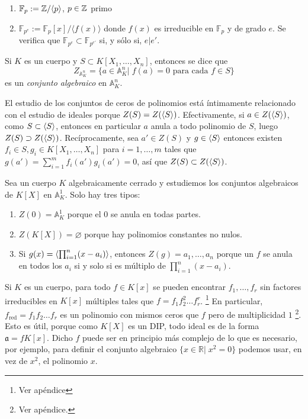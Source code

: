 \documentclass[./main.tex]{subfiles}
\begin{document}
	\begin{example}
		\begin{enumerate}
			\item $\mathbb{F}_p:=\mathbb{Z}/\langle p\rangle$, $p\in\mathbb{Z}$ primo
			\item $\mathbb{F}_{p^e}:=\mathbb{F}_p[x]/\langle f(x)\rangle$ donde $f(x)$ es irreducible en $\mathbb{F}_p$ y de grado $e$. Se verifica que $\mathbb{F}_{p^{e}}\subset\mathbb{F}_{p^{e'}}$ si, y sólo si, $e|e'$.
		\end{enumerate}
	\end{example}
	
	\begin{definition}
		Si $K$ es un cuerpo y $S\subset K[X_1, \dots, X_n]$, entonces se dice que
		\[Z_{\mathbb A^n_K} = \{a \in \mathbb A^n_K \big \vert \; f(a) = 0 \text{ para cada } f\in S \} \]
		es un \emph{conjunto algebraico} en $\mathbb A^n_K$.
	\end{definition}
	
	El estudio de los conjuntos de ceros de polinomios está íntimamente relacionado con el estudio de ideales porque $Z ( S) = Z ( \langle S \rangle )$. Efectivamente, si $a\in Z(\langle S \rangle)$, como $S \subset \langle S \rangle$, entonces en particular $a$ anula a todo polinomio de $S$, luego $Z ( S) \supset Z ( \langle S \rangle )$. Recíprocamente, sea $a'\in Z(S)$ y $g \in \langle S \rangle$ entonces existen $f_i\in S, g_i \in K[X_1,\dots, X_n]$ para $i = 1,\dots, m$ tales que $g(a') = \sum_{i=1}^m f_i(a')g_i(a') = 0$, así que $Z ( S) \subset Z ( \langle S \rangle )$.
	
	\begin{example}
		Sea un cuerpo $K$ algebraicamente cerrado y estudiemos los conjuntos algebraicos de $K[X]$ en $\mathbb A^1_K$. Solo hay tres tipos:
		\begin{enumerate}
			\item $ Z(0) = \mathbb A^1_K$ porque el $0$ se anula en todas partes.
			\item $Z(K[X]) = \varnothing$ porque hay polinomios constantes no nulos.
			\item Si $g(x) = \langle \prod_{i=1}^n (x - a_i) \rangle$, entonces $ Z(g) = {a_1,\dots, a_n}$ porque un $f$ se anula en todos los $a_i$ si y solo si es múltiplo de $\prod_{i=1}^n (x-a_i)$.
		\end{enumerate}
	\end{example}
	
	Si $K$ es un cuerpo, para todo $f\in K[x]$ se pueden encontrar $f_1,\dots, f_r$ sin factores irreducibles en $K[x]$ múltiples tales que $f = f_1 f_2^2 \dots f_r^r$. \footnote{Ver apéndice} En particular, $f_{\operatorname{red}} = f_1f_2 \dots f_r$ es un polinomio con mismos ceros que $f$ pero de multiplicidad $1$ \footnote{Ver apéndice.}. Esto es útil, porque como $K[X]$ es un DIP, todo ideal es de la forma $\mathfrak a = f K[x] $. Dicho $f$ puede ser en principio más complejo de lo que es necesario, por ejemplo, para definir el conjunto algebraico $\{x \in \mathbb R \vert \; x^2 = 0 \}$ podemos usar, en vez de $x^2$, el polinomio $x$.
	
\end{document}
